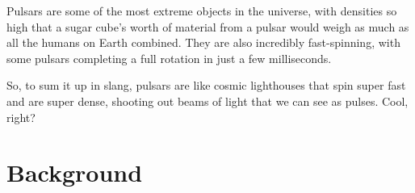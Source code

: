 \documentclass[a4paper, oneside]{book}
\begin{document}
Pulsars are some of the most extreme objects in the universe, with densities so high that a sugar cube's worth of material from a pulsar would weigh as much as all the humans on Earth combined. They are also incredibly fast-spinning, with some pulsars completing a full rotation in just a few milliseconds.

So, to sum it up in slang, pulsars are like cosmic lighthouses that spin super fast and are super dense, shooting out beams of light that we can see as pulses. Cool, right?

\section{Background}
\end{document}
